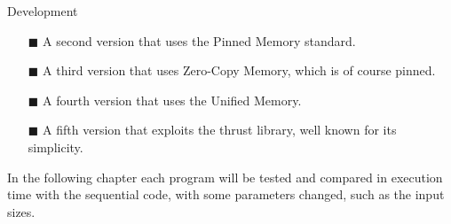 \documentclass[a4paper,oneside,11pt,DIV12,headsepline,footexclude,headexclude]{scrartcl}
\begin{document}
\begin{section}{Development}
\begin{enumerate}
    \item[$\blacksquare$] A second version that uses the Pinned Memory standard.
\\
    \item[$\blacksquare$] A third version that uses Zero-Copy Memory, which is of course pinned.
\\
    \item[$\blacksquare$] A fourth version that uses the Unified Memory.
\\
    \item[$\blacksquare$] A fifth version that exploits the thrust library, well known for its simplicity.
\end{enumerate}
In the following chapter each program will be tested and compared in execution time with the sequential code, with some parameters changed, such as the input sizes.
\end{section}
\end{document}
